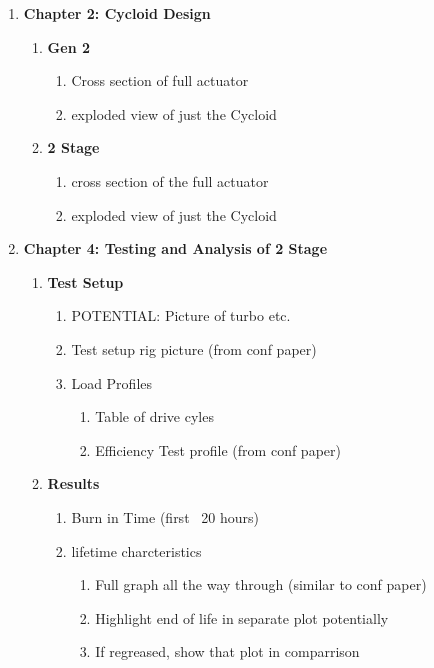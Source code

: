 \begin{enumerate}
	\item \textbf{Chapter 2: Cycloid Design}
	\begin{enumerate}
		\item \textbf{Gen 2}
		\begin{enumerate}
			\item 
			Cross section of full actuator
			\item
			exploded view of just the Cycloid 
		\end{enumerate}
		\item \textbf{2 Stage}
		\begin{enumerate}
			\item 
			cross section of the full actuator
			\item
			exploded view of just the Cycloid 
		\end{enumerate}
	\end{enumerate}

\item \textbf{Chapter 4: Testing and Analysis of 2 Stage}
	\begin{enumerate}
		\item \textbf{Test Setup}
		\begin{enumerate}
			\item POTENTIAL: Picture of turbo etc. 
			\item
			Test setup rig picture (from conf paper)
			\item
			Load Profiles
			\begin{enumerate}
				\item Table of drive cyles 
				\item Efficiency Test profile (from conf paper)
			\end{enumerate}
		\end{enumerate}

		\item \textbf{Results}
		\begin{enumerate}
			\item
			Burn in Time (first ~20 hours)
			\item 
			lifetime charcteristics
			\begin{enumerate}
				\item
				Full graph all the way through (similar to conf paper)
				\item
				Highlight end of life in separate plot potentially
				\item
				If regreased, show that plot in comparrison
			\end{enumerate}
		\end{enumerate}
	\end{enumerate}


\end{enumerate}
